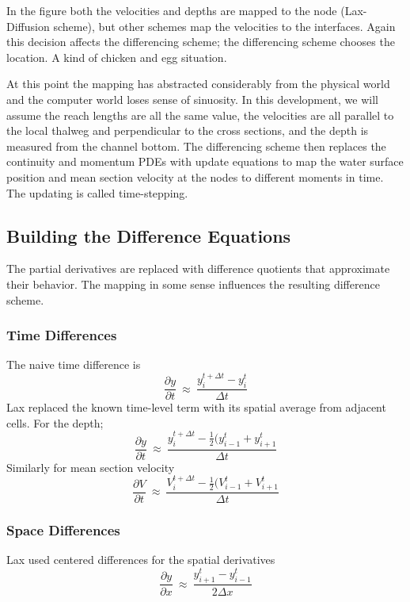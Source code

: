 In the figure both the velocities and depths are mapped to the node (Lax-Diffusion scheme), but other schemes map the velocities to the interfaces. 
Again this decision affects the differencing scheme; the differencing scheme
chooses the location. 
A kind of chicken and egg situation. 

At this point the mapping has abstracted considerably from the physical world and the computer world loses sense of
sinuosity. 
In this development, we will assume the reach lengths are all the same value, the velocities are all parallel to the local thalweg and perpendicular to the cross sections, and the depth is measured from the channel bottom.
The differencing scheme then replaces the continuity and momentum PDEs with update
equations to map the water surface position and mean section velocity at the nodes to different moments in time. 
The updating is called time-stepping.

\subsection{Building the Difference Equations}
The partial derivatives are replaced with difference quotients that approximate their behavior.  
The mapping in some sense influences the resulting difference scheme.  

\subsubsection{Time Differences}
The naive time difference is 
\begin{equation}
\frac{\partial y}{\partial t}~\approx~\frac{y_i^{t+\Delta t}-y_i^t}{\Delta t}
\end{equation}
Lax replaced the known time-level term with its spatial average from adjacent cells.
For the depth;
\begin{equation}
\frac{\partial y}{\partial t}~\approx~\frac{y_i^{t+\Delta t}-\frac{1}{2}(y_{i-1}^t+y_{i+1}^t}{\Delta t}
\end{equation}
Similarly for mean section velocity
\begin{equation}
\frac{\partial V}{\partial t}~\approx~\frac{V_i^{t+\Delta t}-\frac{1}{2}(V_{i-1}^t+V_{i+1}^t}{\Delta t}
\end{equation}

\subsubsection{Space Differences}
Lax used centered differences for the spatial derivatives
\begin{equation}
\frac{\partial y}{\partial x}~\approx~\frac{y_{i+1}^{t}-y_{i-1}^t}{2\Delta x}
\end{equation}

